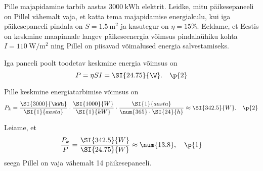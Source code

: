 
Pille majapidamine tarbib aastas $\SI{3000}{\kWh}$ elektrit. Leidke, mitu päikesepaneeli on Pillel vähemalt vaja, et katta tema majapidamise energiakulu, kui iga päikesepaneeli pindala on $S = \SI{1.5}{\m\squared}$ ja kasutegur on $\eta = 15\%$. Eeldame, et Eestis on keskmine maapinnale langev päikeseenergia võimsus pindalaühiku kohta $I = \SI{110}{\W\per\m\squared}$ ning Pillel on piisavad võimalused energia salvestamiseks.


\hint

\solu
Iga paneeli poolt toodetav keskmine energia võimsus on
\begin{equation*}
    P = \eta S I = \SI{24.75}{\W}. \quad\p{2}
\end{equation*}

Pille keskmine energiatarbimise võimsus on
\begin{equation*}
    P_k = \frac{\SI{3000}{\kWh}}{\SI{1}{aasta}} \cdot \frac{\SI{1000}{W}}{\SI{1}{kW}}\cdot\frac{\SI{1}{aasta}}{\num{365}\cdot\SI{24}{h}} \approx \SI{342.5}{W}. \quad\p{2}
\end{equation*}

Leiame, et
\begin{equation*}
    \frac{P_k}{P} = \frac{\SI{342.5}{W}}{\SI{24.75}{W}} \approx \num{13.8}, \quad\p{1}
\end{equation*}
seega Pillel on vaja vähemalt 14 päikesepaneeli. 
\probend